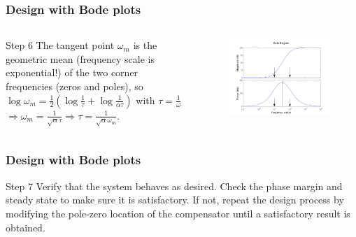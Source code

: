 \begin{frame}\frametitle{Design with Bode plots}

\begin{columns}
	\begin{column}{.49\textwidth}
		\begin{block}{Step 6}
		The tangent point $\omega_m$ is the geometric mean (frequency scale is exponential!) of the two corner frequencies (zeros and poles), so
		$ \log \omega_m = \frac{1}{2}(\log \frac{1}{\tau} + \log \frac{1}{\alpha\tau})$ with $\tau = \frac{1}{\omega}$
		\\ $\Rightarrow \omega_m = \frac{1}{\sqrt{\alpha}\tau} \Rightarrow \tau = \frac{1}{\sqrt{\alpha}\omega_m}$.
		\end{block} 
	\end{column}
	
	\begin{column}{.49\textwidth}
		\begin{figure}
			\centering
			\includegraphics[width=1
			\linewidth]{tangentpointpijlen}
		\end{figure}
	\end{column}
\end{columns}

\end{frame}

\begin{frame}
	\frametitle{Design with Bode plots}
	\begin{block}{Step 7}
		Verify that the system behaves as desired.
		Check the phase margin and steady state to make sure it is satisfactory. If not, repeat the design process
		by modifying the pole-zero location of the compensator until a satisfactory result
		is obtained.
	\end{block}
\end{frame}

